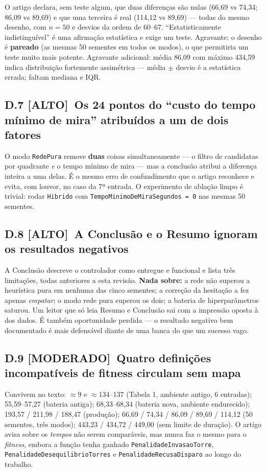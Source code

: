 \documentclass[11pt,a4paper]{article}
\newcommand{\alto}{\textbf{\color{orange!70!black}[ALTO]}}
\newcommand{\moderado}{\textbf{\color{blue!50!black}[MODERADO]}}
\begin{document}
O artigo declara, sem teste algum, que duas diferenças são nulas (66,69 vs 74,34; 86,09 vs 89,69) e
que uma terceira é real (114,12 vs 89,69) --- todas do mesmo desenho, com $n=50$ e desvios da ordem
de 60--67. ``Estatisticamente indistinguível'' é uma afirmação estatística e exige um teste.
Agravante: o desenho é \textbf{pareado} (as mesmas 50 sementes em todos os modos), o que permitiria um
teste muito mais potente. Agravante adicional: média 86,09 com máximo 434,59 indica distribuição
fortemente assimétrica --- média $\pm$ desvio é a estatística errada; faltam mediana e IQR.

\subsection*{D.7 \alto\ Os 24 pontos do ``custo do tempo mínimo de mira'' atribuídos a um de dois fatores}

O modo \texttt{RedePura} remove \textbf{duas} coisas simultaneamente --- o filtro de candidatas por
quadrante \emph{e} o tempo mínimo de mira --- mas a conclusão atribui a diferença inteira a uma
delas. É o mesmo erro de confundimento que o artigo reconhece e evita, com louvor, no caso da 7ª
entrada. O experimento de ablação limpo é trivial: rodar \texttt{Hibrido} com
\texttt{TempoMinimoDeMiraSegundos = 0} nas mesmas 50 sementes.

\subsection*{D.8 \alto\ A Conclusão e o Resumo ignoram os resultados negativos}

A Conclusão descreve o controlador como entregue e funcional e lista três limitações, todas
anteriores a esta revisão. \textbf{Nada sobre:} a rede não superou a heurística pura em nenhuma das
cinco sementes; a correção da hesitação a fez apenas \emph{empatar}; o modo rede pura superou os
dois; a bateria de hiperparâmetros saturou. Um leitor que só leia Resumo e Conclusão sai com a
impressão oposta à dos dados. É também oportunidade perdida --- o resultado negativo bem documentado
é mais defensável diante de uma banca do que um sucesso vago.

\subsection*{D.9 \moderado\ Quatro definições incompatíveis de fitness circulam sem mapa}

Convivem no texto: $\approx$9 e $\approx$134--137 (Tabela 1, ambiente antigo, 6 entradas);
55,59--57,27 (bateria antiga); 68,33--68,34 (bateria nova, ambiente endurecido); 193,57 / 211,98 /
188,47 (produção); 66,69 / 74,34 / 86,09 / 89,69 / 114,12 (50 sementes, três modos); 443,23 / 434,72
/ 449,00 (sem limite de duração). O artigo avisa sobre os \emph{tempos} não serem comparáveis, mas
nunca faz o mesmo para o \emph{fitness}, embora a função tenha ganhado
\texttt{PenalidadeInvasaoTorre}, \texttt{PenalidadeDesequilibrioTorres} e
\texttt{PenalidadeRecusaDisparo} ao longo do trabalho.
\end{document}
